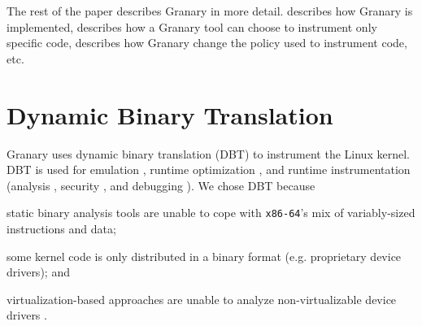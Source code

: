 \documentclass[preprint]{sigplanconf}
\begin{document}
The rest of the paper describes Granary in more detail.  describes how Granary is implemented,  describes how a Granary tool can choose to instrument only specific code,  describes how Granary change the policy used to instrument code, etc.


\section{Dynamic Binary Translation}\label{sec:dbt}

Granary uses dynamic binary translation (DBT) to instrument the Linux kernel. DBT is used for emulation \cite{QEMU}, runtime optimization \cite{DynamoRIOOptimization}, and runtime instrumentation (analysis \cite{DynamoRIO, DRK, btkernel, ProfilingSimics}, security \cite{Vx32,NaCl,ProgramShepherding}, and debugging \cite{Valgrind}). We chose DBT because \begin{inparaenum}[i)]
	\item static binary analysis tools are unable to cope with \texttt{x86-64}'s mix of variably-sized instructions and data; 
	\item some kernel code is only distributed in a binary format (e.g. proprietary device drivers); and
	\item virtualization-based approaches are unable to analyze non-virtualizable device drivers \cite{DRK}.
\end{inparaenum}
\end{document}
